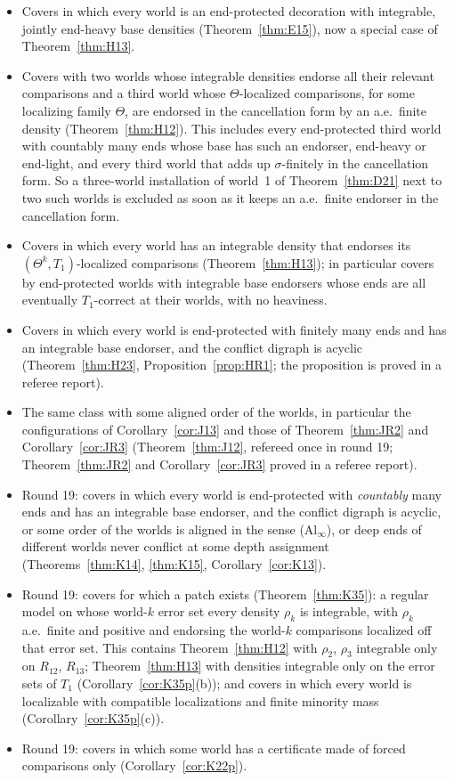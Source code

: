 \documentclass[11pt]{article}
\theoremstyle{definition}
\theoremstyle{remark}
\begin{document}
\begin{itemize}[leftmargin=*]
\item Covers in which every world is an end-protected decoration with integrable, jointly end-heavy base densities (Theorem~\ref{thm:E15}), now a special case of Theorem~\ref{thm:H13}.
\item Covers with two worlds whose integrable densities endorse all their relevant comparisons and a third world whose $\Theta$-localized comparisons, for some localizing family $\Theta$, are endorsed in the cancellation form by an a.e.\ finite density (Theorem~\ref{thm:H12}). This includes every end-protected third world with countably many ends whose base has such an endorser, end-heavy or end-light, and every third world that adds up $\sigma$-finitely in the cancellation form. So a three-world installation of world~1 of Theorem~\ref{thm:D21} next to two such worlds is excluded as soon as it keeps an a.e.\ finite endorser in the cancellation form.
\item Covers in which every world has an integrable density that endorses its $(\Theta^k,T_1)$-localized comparisons (Theorem~\ref{thm:H13}); in particular covers by end-protected worlds with integrable base endorsers whose ends are all eventually $T_1$-correct at their worlds, with no heaviness.
\item Covers in which every world is end-protected with finitely many ends and has an integrable base endorser, and the conflict digraph is acyclic (Theorem~\ref{thm:H23}, Proposition~\ref{prop:HR1}; the proposition is proved in a referee report).
\item The same class with some aligned order of the worlds, in particular the configurations of Corollary~\ref{cor:J13} and those of Theorem~\ref{thm:JR2} and Corollary~\ref{cor:JR3} (Theorem~\ref{thm:J12}, refereed once in round 19; Theorem~\ref{thm:JR2} and Corollary~\ref{cor:JR3} proved in a referee report).
\item Round 19: covers in which every world is end-protected with \emph{countably} many ends and has an integrable base endorser, and the conflict digraph is acyclic, or some order of the worlds is aligned in the sense (Al$_\infty$), or deep ends of different worlds never conflict at some depth assignment (Theorems~\ref{thm:K14}, \ref{thm:K15}, Corollary~\ref{cor:K13}).
\item Round 19: covers for which a patch exists (Theorem~\ref{thm:K35}): a regular model on whose world-$k$ error set every density $\rho_k$ is integrable, with $\rho_k$ a.e.\ finite and positive and endorsing the world-$k$ comparisons localized off that error set. This contains Theorem~\ref{thm:H12} with $\rho_2$, $\rho_3$ integrable only on $R_{12}$, $R_{13}$; Theorem~\ref{thm:H13} with densities integrable only on the error sets of $T_1$ (Corollary~\ref{cor:K35p}(b)); and covers in which every world is localizable with compatible localizations and finite minority mass (Corollary~\ref{cor:K35p}(c)).
\item Round 19: covers in which some world has a certificate made of forced comparisons only (Corollary~\ref{cor:K22p}).
\end{itemize}
\end{document}
